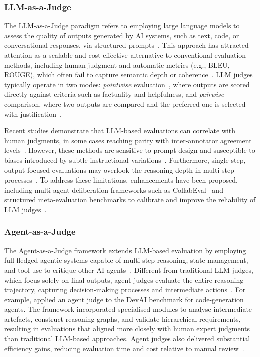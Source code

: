 \subsubsection{LLM-as-a-Judge}
The LLM-as-a-Judge paradigm refers to employing large language models to assess the quality of outputs generated by AI systems, such as text, code, or conversational responses, via structured prompts~\citep{arabzadeh2024towards,li2024llms,qian2025enhancing}. This approach has attracted attention as a scalable and cost-effective alternative to conventional evaluation methods, including human judgment and automatic metrics (e.g., BLEU, ROUGE), which often fail to capture semantic depth or coherence~\citep{arabzadeh2024towards}. LLM judges typically operate in two modes: \textit{pointwise} evaluation~\citep{ruan2024liveideabench}, where outputs are scored directly against criteria such as factuality and helpfulness, and \textit{pairwise} comparison, where two outputs are compared and the preferred one is selected with justification~\citep{li2024llms,zhao2024auto}.

Recent studies demonstrate that LLM-based evaluations can correlate with human judgments, in some cases reaching parity with inter-annotator agreement levels~\citep{arabzadeh2024towards}. However, these methods are sensitive to prompt design and susceptible to biases introduced by subtle instructional variations~\citep{arabzadeh2024towards,zhao2024auto}. Furthermore, single-step, output-focused evaluations may overlook the reasoning depth in multi-step processes~\citep{zhuge2024agent,wang2025dynamically}. To address these limitations, enhancements have been proposed, including multi-agent deliberation frameworks such as CollabEval~\citep{qian2025enhancing} and structured meta-evaluation benchmarks to calibrate and improve the reliability of LLM judges~\citep{li2024llms,zhao2024auto}.

\subsubsection{Agent-as-a-Judge}
The Agent-as-a-Judge framework extends LLM-based evaluation by employing full-fledged agentic systems capable of multi-step reasoning, state management, and tool use to critique other AI agents~\citep{zhuge2024agent,zhao2024auto,qian2025enhancing}. Different from traditional LLM judges, which focus solely on final outputs, agent judges evaluate the entire reasoning trajectory, capturing decision-making processes and intermediate actions~\citep{zhuge2024agent}. For example, \cite{zhuge2024agent} applied an agent judge to the DevAI benchmark for code-generation agents. The framework incorporated specialised modules to analyse intermediate artefacts, construct reasoning graphs, and validate hierarchical requirements, resulting in evaluations that aligned more closely with human expert judgments than traditional LLM-based approaches. Agent judges also delivered substantial efficiency gains, reducing evaluation time and cost relative to manual review~\citep{zhuge2024agent,zhao2024auto}.

